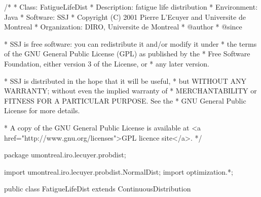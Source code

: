 \begin{code}
\begin{hide}
/*
 * Class:        FatigueLifeDist
 * Description:  fatigue life distribution
 * Environment:  Java
 * Software:     SSJ 
 * Copyright (C) 2001  Pierre L'Ecuyer and Universite de Montreal
 * Organization: DIRO, Universite de Montreal
 * @author       
 * @since

 * SSJ is free software: you can redistribute it and/or modify it under
 * the terms of the GNU General Public License (GPL) as published by the
 * Free Software Foundation, either version 3 of the License, or
 * any later version.

 * SSJ is distributed in the hope that it will be useful,
 * but WITHOUT ANY WARRANTY; without even the implied warranty of
 * MERCHANTABILITY or FITNESS FOR A PARTICULAR PURPOSE.  See the
 * GNU General Public License for more details.

 * A copy of the GNU General Public License is available at
   <a href="http://www.gnu.org/licenses">GPL licence site</a>.
 */
\end{hide}
package umontreal.iro.lecuyer.probdist;
\begin{hide}
import umontreal.iro.lecuyer.probdist.NormalDist;
import optimization.*;
\end{hide}

public class FatigueLifeDist extends ContinuousDistribution\begin{hide} {
   protected double mu;
   protected double beta;
   protected double gamma;

   private static class Optim implements Uncmin_methods
   {
      private int n;
      private double[] xi;
      private double mu;

      public Optim (double[] x, int n, double min)
      {
         this.n = n;
         this.mu = min;
         this.xi = new double[n];
         System.arraycopy (x, 0, this.xi, 0, n);
      }

      public double f_to_minimize (double[] p)
      {
         double sum = 0.0;

         if ((p[1] <= 0.0) || (p[2] <= 0.0))
            return 1e200;
      
         for (int i = 0; i < n; i++)
            sum -= Math.log (density (mu, p[1], p[2], xi[i]));

         return sum;
      }
      
      public void gradient (double[] x, double[] g)
      {
      }

      public void hessian (double[] x, double[][] h)
      {
      }
   }
\end{hide}
\end{code}

